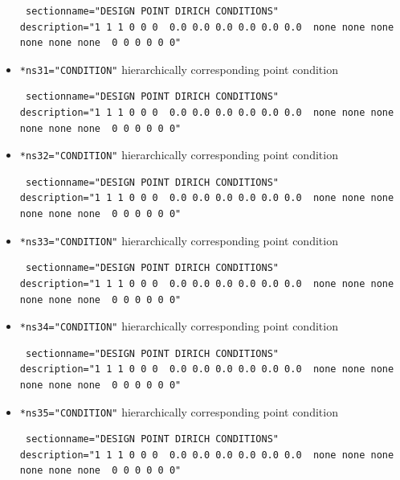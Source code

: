 \begin{itemize}
\begin{small} \begin{verbatim} sectionname="DESIGN POINT DIRICH CONDITIONS"
description="1 1 1 0 0 0  0.0 0.0 0.0 0.0 0.0 0.0  none none none none none none  0 0 0 0 0 0"
\end{verbatim} \end{small} \item \verb|*ns31="CONDITION"| \qquad hierarchically corresponding point condition
\begin{small} \begin{verbatim} sectionname="DESIGN POINT DIRICH CONDITIONS"
description="1 1 1 0 0 0  0.0 0.0 0.0 0.0 0.0 0.0  none none none none none none  0 0 0 0 0 0"
\end{verbatim} \end{small} \item \verb|*ns32="CONDITION"| \qquad hierarchically corresponding point condition
\begin{small} \begin{verbatim} sectionname="DESIGN POINT DIRICH CONDITIONS"
description="1 1 1 0 0 0  0.0 0.0 0.0 0.0 0.0 0.0  none none none none none none  0 0 0 0 0 0"
\end{verbatim} \end{small} \item \verb|*ns33="CONDITION"| \qquad hierarchically corresponding point condition
\begin{small} \begin{verbatim} sectionname="DESIGN POINT DIRICH CONDITIONS"
description="1 1 1 0 0 0  0.0 0.0 0.0 0.0 0.0 0.0  none none none none none none  0 0 0 0 0 0"
\end{verbatim} \end{small} \item \verb|*ns34="CONDITION"| \qquad hierarchically corresponding point condition
\begin{small} \begin{verbatim} sectionname="DESIGN POINT DIRICH CONDITIONS"
description="1 1 1 0 0 0  0.0 0.0 0.0 0.0 0.0 0.0  none none none none none none  0 0 0 0 0 0"
\end{verbatim} \end{small} \item \verb|*ns35="CONDITION"| \qquad hierarchically corresponding point condition
\begin{small} \begin{verbatim} sectionname="DESIGN POINT DIRICH CONDITIONS"
description="1 1 1 0 0 0  0.0 0.0 0.0 0.0 0.0 0.0  none none none none none none  0 0 0 0 0 0"

\end{verbatim}
\end{small}
\end{itemize}
